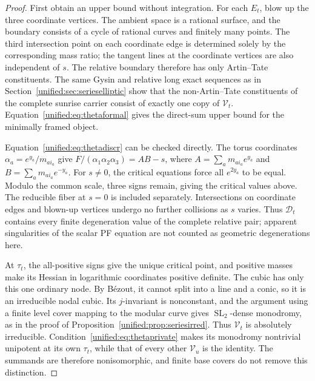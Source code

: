 \documentclass[11pt,a4paper,oneside]{article}
\theoremstyle{plain}
\theoremstyle{definition}
\theoremstyle{remark}
\numberwithin{equation}{section}
\begin{document}
\begin{proof}
First obtain an upper bound without integration. For each $E_t$, blow up the three coordinate vertices.
The ambient space is a rational surface, and the boundary consists of a cycle of rational curves and finitely many points.
The third intersection point on each coordinate edge is determined solely by the corresponding mass ratio; the tangent lines at the coordinate vertices are also independent of $s$.
The relative boundary therefore has only Artin--Tate constituents.
The same Gysin and relative long exact sequences as in Section~\ref{unified:sec:serieselliptic}
show that the non-Artin--Tate constituents of the complete sunrise carrier consist of exactly one copy of $\mathcal V_t$.
Equation~\eqref{unified:eq:thetaformal} gives the direct-sum upper bound for the minimally framed object.

Equation~\eqref{unified:eq:thetadiscr} can be checked directly. The torus coordinates
$\alpha_a=e^{y_a}/m_{ai_a}$ give
$F/(\alpha_1\alpha_2\alpha_3)=AB-s$,
where $A=\sum_a m_{ai_a}e^{y_a}$ and $B=\sum_a m_{ai_a}e^{-y_a}$.
For $s\ne0$, the critical equations force all $e^{2y_a}$ to be equal.
Modulo the common scale, three signs remain, giving the critical values above.
The reducible fiber at $s=0$ is included separately. Intersections on coordinate edges and blown-up vertices undergo no further collisions as $s$ varies.
Thus $\mathcal D_t$ contains every finite degeneration value of the complete relative pair;
apparent singularities of the scalar PF equation are not counted as geometric degenerations here.

At $\tau_t$, the all-positive signs give the unique critical point, and positive masses make its Hessian in logarithmic coordinates positive definite.
The cubic has only this one ordinary node. By Bézout, it cannot split into a line and a conic,
so it is an irreducible nodal cubic. Its $j$-invariant is nonconstant,
and the argument using a finite level cover mapping to the modular curve gives $\operatorname{SL}_2$-dense monodromy,
as in the proof of Proposition~\ref{unified:prop:seriesirred}. Thus $\mathcal V_t$ is absolutely irreducible.
Condition~\eqref{unified:eq:thetaprivate} makes its monodromy nontrivial unipotent at its own $\tau_t$,
while that of every other $\mathcal V_u$ is the identity. The summands are therefore nonisomorphic, and finite base covers do not remove this distinction.


\end{proof}
\end{document}
